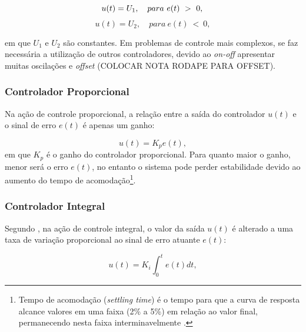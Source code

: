 
\begin{equation}
 u(t) = U_1, \quad para \ e(t) \ > \ 0, \\ 
\end{equation}
\begin{equation}
 u(t) = U_2, \quad para \ e(t) \ < \ 0,
\end{equation}

em que $U_1$ e $U_2$ são constantes.
Em problemas de controle mais complexos, se faz necessária a utilização de outros controladores, devido ao \textit{on-off} apresentar 
muitas oscilações e \textit{offset} (COLOCAR NOTA RODAPE PARA OFFSET).

\subsubsection{Controlador Proporcional}


Na ação de controle proporcional, a relação entre a saída do controlador $u(t)$ e o sinal de erro $e(t)$ 
é apenas um ganho: 

\begin{equation}\label{eq:prop}
 u(t) = K_pe(t),	
\end{equation}
em que $K_p$ é o ganho do controlador proporcional. 
Para  quanto maior o ganho, menor será o erro $e(t)$, no entanto o sistema pode perder estabilidade 
devido ao aumento do 
tempo de acomodação\footnote{Tempo de acomodação (\textit{settling time}) é o tempo para que a curva de resposta alcance 
valores em uma faixa (2\% a 5\%) em relação ao valor final, permanecendo nesta faixa interminavelmente \cite{ogata}.}.

\subsubsection{Controlador Integral}

Segundo , na ação de controle integral, o valor da saída $u(t)$ é alterado a uma taxa de variação proporcional 
ao sinal de erro atuante $e(t)$:

\begin{equation}
 u(t) = K_i \int_{0}^{t}e(t)dt,
\end{equation}


